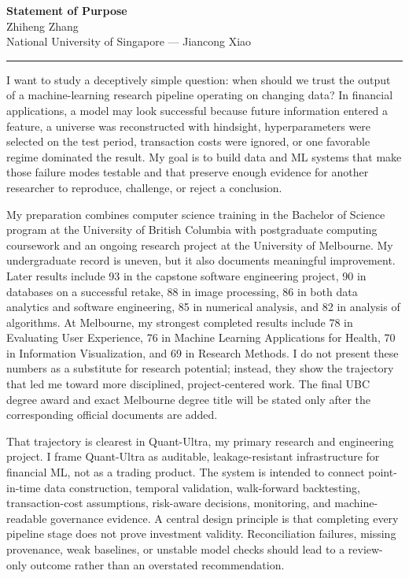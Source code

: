 \documentclass[11pt]{article}
\newcommand{\ApplicantName}{Zhiheng Zhang}
\begin{document}
\begin{center}
{\LARGE\bfseries Statement of Purpose}\\[0.25em]
{\large \ApplicantName}\\
National University of Singapore --- Jiancong Xiao
\end{center}
\vspace{0.35em}\hrule\vspace{0.65em}

I want to study a deceptively simple question: when should we trust the output of a machine-learning research pipeline operating on changing data? In financial applications, a model may look successful because future information entered a feature, a universe was reconstructed with hindsight, hyperparameters were selected on the test period, transaction costs were ignored, or one favorable regime dominated the result. My goal is to build data and ML systems that make those failure modes testable and that preserve enough evidence for another researcher to reproduce, challenge, or reject a conclusion.

My preparation combines computer science training in the Bachelor of Science program at the University of British Columbia with postgraduate computing coursework and an ongoing research project at the University of Melbourne. My undergraduate record is uneven, but it also documents meaningful improvement. Later results include 93 in the capstone software engineering project, 90 in databases on a successful retake, 88 in image processing, 86 in both data analytics and software engineering, 85 in numerical analysis, and 82 in analysis of algorithms. At Melbourne, my strongest completed results include 78 in Evaluating User Experience, 76 in Machine Learning Applications for Health, 70 in Information Visualization, and 69 in Research Methods. I do not present these numbers as a substitute for research potential; instead, they show the trajectory that led me toward more disciplined, project-centered work. The final UBC degree award and exact Melbourne degree title will be stated only after the corresponding official documents are added.

That trajectory is clearest in Quant-Ultra, my primary research and engineering project. I frame Quant-Ultra as auditable, leakage-resistant infrastructure for financial ML, not as a trading product. The system is intended to connect point-in-time data construction, temporal validation, walk-forward backtesting, transaction-cost assumptions, risk-aware decisions, monitoring, and machine-readable governance evidence. A central design principle is that completing every pipeline stage does not prove investment validity. Reconciliation failures, missing provenance, weak baselines, or unstable model checks should lead to a review-only outcome rather than an overstated recommendation.
\end{document}
